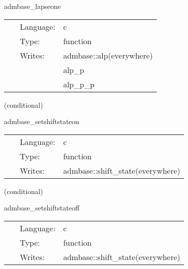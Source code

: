 \hspace{5mm} admbase\_lapseone 

\hspace{5mm}{\it set the lapse to 1 at all points } 


\hspace{5mm}

 \begin{tabular*}{160mm}{cll} 
~ & Language:  & c \\ 
~ & Type:  & function \\ 
~ & Writes:  & admbase::alp(everywhere) \\ 
~& ~ &alp\_p\\ 
~& ~ &alp\_p\_p\\ 
\end{tabular*} 


\vspace{5mm}

   (conditional) 

\hspace{5mm} admbase\_setshiftstateon 

\hspace{5mm}{\it set the shift\_state variable to 1 } 


\hspace{5mm}

 \begin{tabular*}{160mm}{cll} 
~ & Language:  & c \\ 
~ & Type:  & function \\ 
~ & Writes:  & admbase::shift\_state(everywhere) \\ 
\end{tabular*} 


\vspace{5mm}

   (conditional) 

\hspace{5mm} admbase\_setshiftstateoff 

\hspace{5mm}{\it set the shift\_state variable to 0 } 


\hspace{5mm}

 \begin{tabular*}{160mm}{cll} 
~ & Language:  & c \\ 
~ & Type:  & function \\ 
~ & Writes:  & admbase::shift\_state(everywhere) \\ 
\end{tabular*} 


